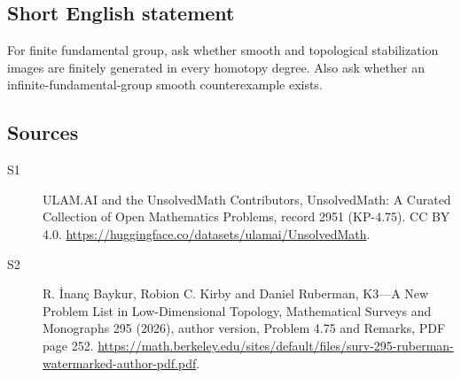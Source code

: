 \documentclass[11pt]{article}
\begin{document}
\subsection{Short English statement}
For finite fundamental group, ask whether smooth and topological stabilization images are finitely generated in every homotopy degree. Also ask whether an infinite-fundamental-group smooth counterexample exists.
\subsection{Sources}
\begin{description}
\item[\hypertarget{source:2951:1}{S1}] ULAM.AI and the UnsolvedMath Contributors, UnsolvedMath: A Curated Collection of Open Mathematics Problems, record 2951 (KP-4.75). CC BY 4.0. \url{https://huggingface.co/datasets/ulamai/UnsolvedMath}.
\item[\hypertarget{source:2951:2}{S2}] R. İnanç Baykur, Robion C. Kirby and Daniel Ruberman, K3—A New Problem List in Low-Dimensional Topology, Mathematical Surveys and Monographs 295 (2026), author version, Problem 4.75 and Remarks, PDF page 252. \url{https://math.berkeley.edu/sites/default/files/surv-295-ruberman-watermarked-author-pdf.pdf}.
\end{description}
\label{end:2951}
\end{document}
